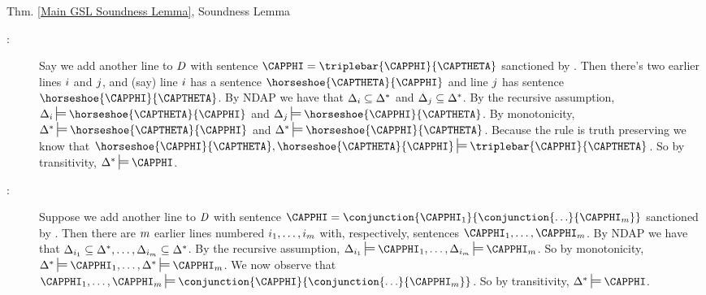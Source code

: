 \begin{PROOFOF}{Thm. \ref{Main GSL Soundness Lemma}, Soundness Lemma}
\begin{description}
\begin{description}
\item[:]
Say we add another line to $\mathit{D}$ with sentence $\CAPPHI=\triplebar{\CAPPHI}{\CAPTHETA}$ sanctioned by .
Then there's two earlier lines $i$ and $j$, and (say) line $i$ has a sentence $\horseshoe{\CAPTHETA}{\CAPPHI}$ and line $j$ has sentence $\horseshoe{\CAPPHI}{\CAPTHETA}$. 
By NDAP we have that $\Delta_{i}\subseteq\Delta^*$ and $\Delta_{j}\subseteq\Delta^*$.
By the recursive assumption, $\Delta_{\integer{i}}\sdtstile{}{}\horseshoe{\CAPTHETA}{\CAPPHI}$ and $\Delta_{\integer{j}}\sdtstile{}{}\horseshoe{\CAPPHI}{\CAPTHETA}$.
By monotonicity, $\Delta^*\sdtstile{}{}\horseshoe{\CAPTHETA}{\CAPPHI}$ and $\Delta^*\sdtstile{}{}\horseshoe{\CAPPHI}{\CAPTHETA}$.
Because the rule is truth preserving we know that $\horseshoe{\CAPPHI}{\CAPTHETA},\horseshoe{\CAPTHETA}{\CAPPHI}\sdtstile{}{}\triplebar{\CAPPHI}{\CAPTHETA}$.
So by transitivity, $\Delta^*\sdtstile{}{}\CAPPHI$.

\item[:]
Suppose we add another line to $\mathit{D}$ with sentence $\CAPPHI=\conjunction{\CAPPHI_1}{\conjunction{\ldots}{\CAPPHI_{\integer{m}}}}$ sanctioned by .
Then there are $m$ earlier lines numbered $i_{1},\ldots,i_{m}$ with, respectively, sentences $\CAPPHI_1,\ldots,\CAPPHI_{\integer{m}}$. 
By NDAP we have that $\Delta_{i_1}\subseteq\Delta^*,\ldots,\Delta_{i_m}\subseteq\Delta^*$.
By the recursive assumption, $\Delta_{\integer{i}_1}\sdtstile{}{}\CAPPHI_1,\ldots,\Delta_{\integer{i}_\integer{m}}\sdtstile{}{}\CAPPHI_{\integer{m}}$.
So by monotonicity, $\Delta^*\sdtstile{}{}\CAPPHI_1,\ldots,\Delta^*\sdtstile{}{}\CAPPHI_{\integer{m}}$.
We now observe that $\CAPPHI_1,\ldots,\CAPPHI_{\integer{m}}\sdtstile{}{}\conjunction{\CAPPHI}{\conjunction{\ldots}{\CAPPHI_{\integer{m}}}}$.
So by transitivity, $\Delta^*\sdtstile{}{}\CAPPHI$.


\end{description}
\end{description}
\end{PROOFOF}

